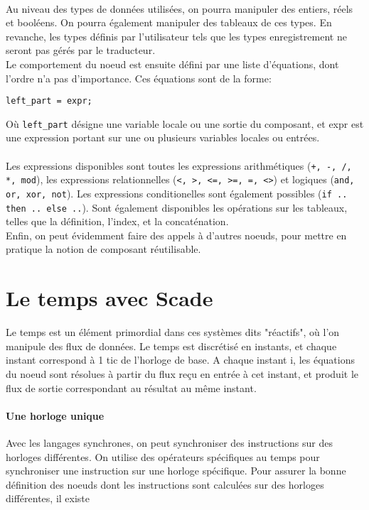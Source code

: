 \paragraph{}
Au niveau des types de données utilisées, on pourra manipuler
des entiers, réels et booléens. On pourra également manipuler des
tableaux de ces types. En revanche, les types définis par
l'utilisateur tels que les types enregistrement ne seront pas gérés
par le traducteur.\\
Le comportement du noeud est ensuite défini par une liste d'équations,
dont l'ordre n'a pas d'importance. Ces équations sont de la forme:
\begin{verbatim}
left_part = expr;
\end{verbatim}
Où \texttt{left\_part} désigne une variable locale ou une sortie du composant, et expr
est une expression portant sur une ou plusieurs variables locales ou entrées.

\paragraph{}
Les expressions disponibles sont toutes les expressions arithmétiques
(\texttt{+, -, /, *, mod}), les expressions relationnelles (\texttt{<, >, <=, >=, =, <>})
et logiques (\texttt{and, or, xor, not}). Les expressions conditionelles sont également
possibles (\texttt{if .. then .. else ..}). Sont également disponibles les opérations sur les tableaux, telles que
la définition, l'index, et la concaténation.\\
Enfin, on peut évidemment faire des appels à d'autres
noeuds, pour mettre en pratique la notion de composant réutilisable. \\




\section{Le temps avec Scade}

Le temps est un élément primordial dans ces systèmes dits "réactifs", où
l'on manipule des flux de données. Le temps est discrétisé en instants,
et chaque instant correspond à 1 tic de l'horloge de base. A chaque
instant i, les équations du noeud sont résolues à partir du flux reçu
en entrée à cet instant, et produit le flux de sortie correspondant au
résultat au même instant.

\paragraph{Une horloge unique}
Avec les langages synchrones, on peut
synchroniser des instructions sur des horloges différentes. On utilise des
opérateurs spécifiques au temps pour synchroniser une instruction sur une
horloge spécifique. Pour assurer la bonne définition des noeuds dont les
instructions sont calculées sur des horloges différentes, il existe


